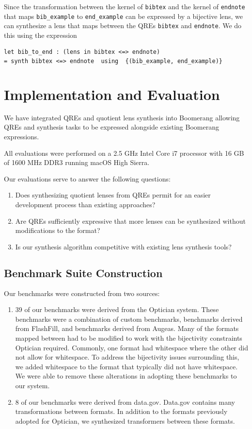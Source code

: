 \documentclass[acmsmall,review,anonymous]{acmart}\settopmatter{printfolios=true,printccs=false,printacmref=false}
\newcommand{\cd}[1]{\lstinline[backgroundcolor=\color{white}]$#1$}
\begin{document}
Since the transformation between the kernel of \cd{bibtex} and the kernel of
\cd{endnote} that maps \cd{bib_example} to \cd{end_example} can be
expressed by a bijective lens, we can synthesize a lens that maps between the
QREs \cd{bibtex} and \cd{endnote}. We do this using the expression

\begin{lstlisting}
let bib_to_end : (lens in bibtex <=> endnote)
= synth bibtex <=> endnote  using  {(bib_example, end_example)}
\end{lstlisting}

\section{Implementation and Evaluation}
\label{impl}


We have integrated QREs and quotient lens synthesis into Boomerang allowing QREs
and synthesis tasks to be expressed alongside existing Boomerang expressions.

All evaluations were performed on a 2.5 GHz Intel Core i7 processor with 16 GB
of 1600 MHz DDR3 running macOS High Sierra.

Our evaluations serve to answer the following questions:
\begin{enumerate}
  \item Does synthesizing quotient lenses from QREs permit for an easier
  development process than existing approaches?
  
  \item Are QREs sufficiently expressive that more lenses can be synthesized
  without modifications to the format?
  
  \item Is our synthesis algorithm competitive with existing lens synthesis
  tools?
\end{enumerate}

\subsection{Benchmark Suite Construction}
Our benchmarks were constructed from two sources:
\begin{enumerate}
  \item 39 of our benchmarks were derived from the Optician system.  These
  benchmarks were a combination of custom benchmarks, benchmarks derived from
  FlashFill, and benchmarks derived from Augeas.  Many of the formats mapped
  between had to be modified to work with the bijectivity constraints
  Optician required.  Commonly, one format had whitespace where the other did
  not allow for whitespace.  To address the bijectivity issues surrounding this,
  we added whitespace to the format that typically did not have whitespace.  We
  were able to remove these alterations in adopting these benchmarks to our
  system.
  
  \item 8 of our benchmarks were derived from data.gov.  Data.gov contains
  many transformations between formats.  In addition to the formats previously
  adopted for Optician, we synthesized transformers between these formats.
\end{enumerate}
\end{document}
